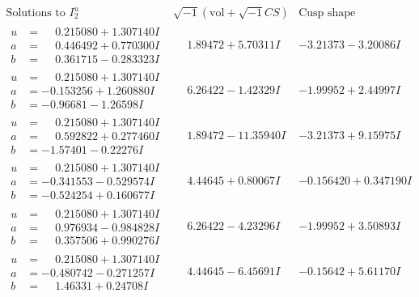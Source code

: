 \documentclass[1p]{elsarticle_modified}
\theoremstyle{definition}
\newcommand{\I}{\sqrt{-1}}
\begin{document}
$$\begin{array}{c|c|c}  
\text{Solutions to }I^u_{2}& \I (\text{vol} + \sqrt{-1}CS) & \text{Cusp shape}\\
 \hline 
\begin{aligned}
u &= \phantom{-}0.215080 + 1.307140 I \\
a &= \phantom{-}0.446492 + 0.770300 I \\
b &= \phantom{-}0.361715 - 0.283323 I\end{aligned}
 & \phantom{-}1.89472 + 5.70311 I & -3.21373 - 3.20086 I \\ \hline\begin{aligned}
u &= \phantom{-}0.215080 + 1.307140 I \\
a &= -0.153256 + 1.260880 I \\
b &= -0.96681 - 1.26598 I\end{aligned}
 & \phantom{-}6.26422 - 1.42329 I & -1.99952 + 2.44997 I \\ \hline\begin{aligned}
u &= \phantom{-}0.215080 + 1.307140 I \\
a &= \phantom{-}0.592822 + 0.277460 I \\
b &= -1.57401 - 0.22276 I\end{aligned}
 & \phantom{-}1.89472 - 11.35940 I & -3.21373 + 9.15975 I \\ \hline\begin{aligned}
u &= \phantom{-}0.215080 + 1.307140 I \\
a &= -0.341553 - 0.529574 I \\
b &= -0.524254 + 0.160677 I\end{aligned}
 & \phantom{-}4.44645 + 0.80067 I & -0.156420 + 0.347190 I \\ \hline\begin{aligned}
u &= \phantom{-}0.215080 + 1.307140 I \\
a &= \phantom{-}0.976934 - 0.984828 I \\
b &= \phantom{-}0.357506 + 0.990276 I\end{aligned}
 & \phantom{-}6.26422 - 4.23296 I & -1.99952 + 3.50893 I \\ \hline\begin{aligned}
u &= \phantom{-}0.215080 + 1.307140 I \\
a &= -0.480742 - 0.271257 I \\
b &= \phantom{-}1.46331 + 0.24708 I\end{aligned}
 & \phantom{-}4.44645 - 6.45691 I & -0.15642 + 5.61170 I \\ \hline\begin{aligned}

\end{aligned}
\end{array}$$
\end{document}
